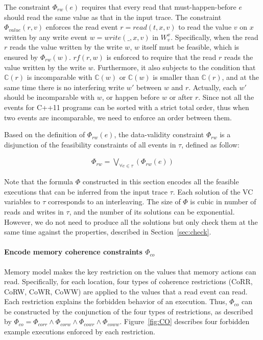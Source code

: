 \documentclass[preprint, numbers, 10pt]{sigplanconf}
\begin{document}
The constraint $\Phi_{rw}(e)$ requires that every read that must-happen-before 
$e$ should read the same value as that in the input trace. 
The constraint $\Phi_{value}(r,v)$ enforces the read event $r=read(t ,x,v)$ 
to read the value $v$ on $x$ written by any write event $w =write(\_,x,v)$ in $W^x_v$.
Specifically, when the read $r$ reads the value written by the write $w$,
$w$ itself must be feasible, which is ensured by $\Phi_{rw}(w)$. 
$rf(r,w)$ is enforced to require that the read $r$ reads the value written by the write $w$. 
Furthermore, it also subjects to the condition that $\mathbb{C}(r)$ is incomparable with $\mathbb{C}(w)$ or 
$\mathbb{C}(w)$ is smaller than $\mathbb{C}(r)$, and at the same time 
there is no interfering write $w'$ between $w$ and $r$.  
Actually, each $w'$ should be incomparable with $w$, or happen before
$w$ or after $r$. Since not all the events for C++11 programs can be sorted with 
a strict total order, thus when two events are incomparable, we need to enforce
an order between them. 

Based on the definition of $\Phi_{rw}(e)$, the data-validity constraint $\Phi_{rw}$
is a disjunction of the feasibility constraints of all events in $\tau$, defined as follow:

\begin{equation}
\begin{aligned}
\Phi_{rw} = \bigvee_{\forall e\in \tau} (\Phi_{rw}(e))
\end{aligned}
\end{equation} 

Note that the formula $\Phi$ constructed in this section
encodes all the feasible executions that can be inferred from the 
input trace $\tau$. Each solution of the VC variables to $\tau$ corresponds 
to an interleaving. The size of $\Phi$ is cubic in number of reads and writes in $\tau$, 
and the number of its solutions can be exponential. However, we do not need to
produce all the solutions but only check them at the same time against the properties,
described in Section~\ref{sec:check}. 

\paragraph{Encode memory coherence constraints $\Phi_{co}$}

Memory model makes the key restriction on the values that memory actions can read. 
Specifically, for each location, four types of coherence restrictions 
(CoRR, CoRW, CoWR, CoWW) are applied to the 
values that a read event can read. Each restriction explains the forbidden behavior of 
an execution. Thus, $\Phi_{co}$ can be constructed by the conjunction of the four
types of restrictions, as described by $\Phi_{co}=\Phi_{corr}\wedge \Phi_{corw}
\wedge\Phi_{cowr}\wedge\Phi_{coww}$. 
Figure~\ref{fig:CO} describes four forbidden example executions enforced
by each restriction. 
\end{document}
